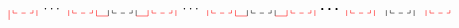 \documentclass[a4paper,11pt]{article}
\begin{document}
\begin{align}
\tikz[scale=0.5,baseline=-0.5ex]{
    \draw[red, dashed] (0,0) -- (1,0);
    \draw[red] (0,0)-- (0,.15);
    \draw[red] (1,0)-- (1,.15);
    \draw[red] (-0.2,0.15)-- (-0.2,-0.35);
    \draw[red] (1.2,-0.15)-- (1.2,0.15);
    \draw[dashed,red] (3,0) -- (4,0);
    \draw[red] (3,0)-- (3,0.15);
    \draw[red] (4,0)-- (4,0.15);
    \draw[red] (2.8,-.15)-- (2.8,0.15);
    \draw[red] (4.2,-0.15)-- (4.2,0.15);
    \draw[dashed,black] (5,0) -- (6,0);
    \draw[black] (5,0)-- (5,0.15);
    \draw[black] (6,0)-- (6,0.15);
    \draw[black] (4.8,0.15)-- (4.8,-0.15);
    \draw[black] (6.2,-0.15)-- (6.2,0.15);
    \draw[dashed,red] (7,0) -- (8,0);
    \draw[red] (7,0)-- (7,0.15);
    \draw[red] (8,0)-- (8,0.15);
    \draw[red] (6.8,0.15)-- (6.8,-0.15);
    \draw[red] (8.2,-0.15)-- (8.2,0.15);
    \draw[dashed,red] (7+3,0) -- (8+3,0);
    \draw[red] (7+3,0)-- (7+3,0.15);
    \draw[red] (8+3,0)-- (8+3,0.15);
    \draw[red] (6.8+3,0.15)-- (6.8+3,-0.15);
    \draw[red] (8.2+3,-0.15)-- (8.2+3,0.15);
    \node[] at (2.,0.2) {$\cdots$};
    \node[] at (7+2.,0.2) {$\cdots$};
    \draw[red] (7-2+1.2,-0.15)--(7-2+1.8,-0.15);
    \draw[red] (7-4+1.2,-0.15)--(7-4+1.8,-0.15);
    \draw[dashed,black] (5+7,0) -- (6+7,0);
    \draw[black] (5+7,0)-- (5+7,0.15);
    \draw[black] (6+7,0)-- (6+7,0.15);
    \draw[black] (4.8+7,0.15)-- (4.8+7,-0.15);
    \draw[black] (6.2+7,-0.15)-- (6.2+7,0.15);
    \draw[dashed,red] (7+7,0) -- (8+7,0);
    \draw[red] (7+7,0)-- (7+7,0.15);
    \draw[red] (8+7,0)-- (8+7,0.15);
    \draw[red] (6.8+7,0.15)-- (6.8+7,-0.15);
    \draw[red] (8.2+7,-0.15)-- (8.2+7,0.15);
    \draw[red] (7+7-2+1.2,-0.15)--(7+7-2+1.8,-0.15);
    \draw[red] (7+7-4+1.2,-0.15)--(7+7-4+1.8,-0.15);
    \node[] at (2+14.,0.2) {$\boldsymbol{\cdots}$};
    \draw[dashed,red] (7+3+7,0) -- (8+3+7,0);
    \draw[red] (7+3+7,0)-- (7+3+7,0.15);
    \draw[red] (8+3+7,0)-- (8+3+7,0.15);
    \draw[red] (6.8+3+7,0.15)-- (6.8+3+7,-0.15);
    \draw[red] (8.2+3+7,-0.15)-- (8.2+3+7,0.15);
    \draw[dashed,black] (5+7+7,0) -- (6+7+7,0);
    \draw[black] (5+7+7,0)-- (5+7+7,0.15);
    \draw[black] (6+7+7,0)-- (6+7+7,0.15);
    \draw[black] (4.8+7+7,0.15)-- (4.8+7+7,-0.15);
    \draw[black] (6.2+7+7,-0.15)-- (6.2+7+7,0.15);
    \draw[dashed,red] (7+7+7,0) -- (8+7+7,0);
    \draw[red] (7+7+7,0)-- (7+7+7,0.15);
    \draw[red] (8+7+7,0)-- (8+7+7,0.15);
    \draw[red] (6.8+7+7,0.15)-- (6.8+7+7,-0.15);
}
\end{align}
\end{document}
